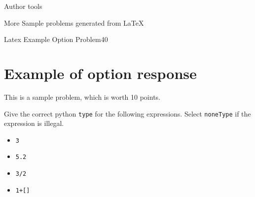 \documentclass[12pt]{article}
\begin{document}
\begin{edXchapter}{Author tools}

\begin{edXsection}{More Sample problems generated from LaTeX}

\begin{edXsequential}

\begin{edXproblem}{Latex Example Option Problem}{40}

\section{Example of option response}  

This is a sample problem, which is worth 10 points.

Give the correct python {\tt type} for the following expressions.  Select {\tt noneType} if the expression is illegal.

\begin{itemize}
\item {\tt 3}   
\item {\tt 5.2} 
\item {\tt 3/2} 
\item {\tt 1+[]} 
\end{itemize}

\end{edXproblem}


\end{edXsequential}

\end{edXsection}
\end{edXchapter}

\end{document}
